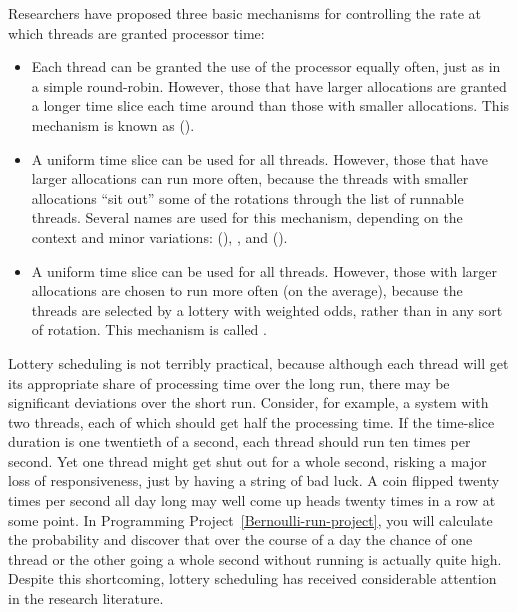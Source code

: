 Researchers have proposed three basic mechanisms for controlling the
rate at which threads are granted processor time:
\begin{itemize}
\item
Each thread can be granted the use of the processor equally often,
just as in a simple round-robin. However, those that have larger
allocations are granted a longer time slice each time around than
those with smaller allocations.  This mechanism is known as  ().
\item
A uniform time slice can be used for all threads.  However, those that
have larger allocations can run more often, because the threads with
smaller allocations ``sit out'' some of the rotations through the list
of runnable threads.  Several names are used for this mechanism, depending
on the context and minor variations:  (),
, and  ().
\item
A uniform time slice can be used for all threads.  However, those with
larger allocations are chosen to run more often (on the average),
because the threads are selected by a lottery with weighted odds,
rather than in any sort of rotation.  This mechanism is called .
\end{itemize}

Lottery scheduling is not
terribly practical, because although each thread will get its
appropriate share of processing time over the long run, there may be
significant deviations over the short run. Consider, for example, a
system with two threads, each of which should get half the processing
time.  If the time-slice duration is one twentieth of a second, each
thread should run ten times per second.  Yet one thread might get shut
out for a whole second, risking a major loss of responsiveness, just
by having a string of bad luck.  A coin flipped twenty times per
second all day long may well come up heads twenty times in a row at
some point.  In Programming Project~\ref{Bernoulli-run-project}, you
will calculate the probability and discover that over the course of a
day the chance of one thread or the other going a whole second
without running is actually quite high.
Despite this shortcoming,
lottery scheduling
has received considerable attention in the research
literature.

